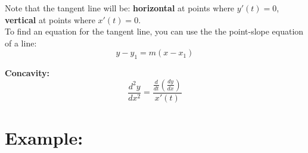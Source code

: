 Note that the tangent line will be: \textbf{horizontal} at points where \(y'(t) = 0\),\\ 
\textbf{vertical} at points where  \(x'(t) = 0\).\\

To find an equation for the tangent line, you can use the  the point-slope equation of a line:
\[y - y_1 = m(x-x_1)\]

\textbf{Concavity:}
\[
\frac{d^2y}{dx^2} = \dfrac{\frac{d}{dt}\left(\frac{dy}{dx}\right)}{x'(t)}\]
%

\section*{Example:}
